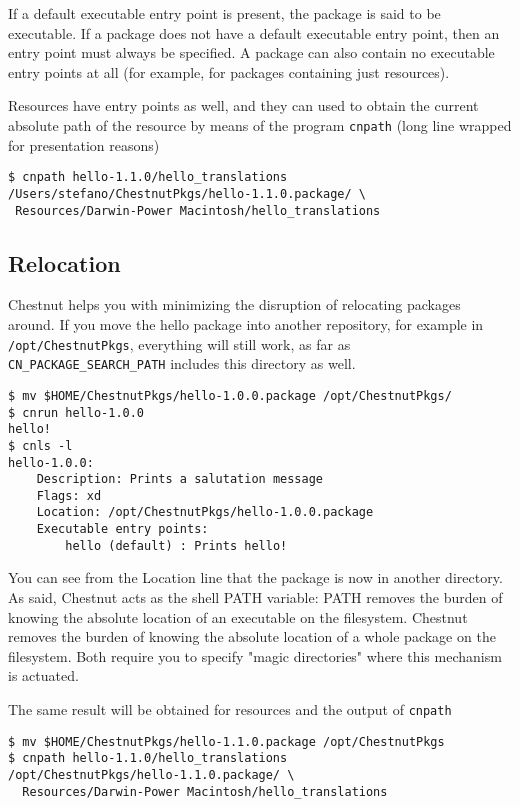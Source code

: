 If a default executable entry point is present, the package is said to be
executable. If a package does not have a default executable entry point, then
an entry point must always be specified. A package can also contain
no executable entry points at all (for example, for packages containing just resources).

Resources have entry points as well, and they can used to obtain the current
absolute path of the resource by means of the program \verb+cnpath+ (long line
wrapped for presentation reasons) 
\begin{verbatim}
$ cnpath hello-1.1.0/hello_translations
/Users/stefano/ChestnutPkgs/hello-1.1.0.package/ \ 
 Resources/Darwin-Power Macintosh/hello_translations
\end{verbatim}

\subsection{Relocation}

Chestnut helps you with minimizing the disruption of relocating packages
around.  If you move the hello package into another repository, for
example in \verb+/opt/ChestnutPkgs+, everything will still work, as far as
\verb+CN_PACKAGE_SEARCH_PATH+ includes this directory as well.

\begin{verbatim}
$ mv $HOME/ChestnutPkgs/hello-1.0.0.package /opt/ChestnutPkgs/
$ cnrun hello-1.0.0
hello!
$ cnls -l
hello-1.0.0:
    Description: Prints a salutation message
    Flags: xd
    Location: /opt/ChestnutPkgs/hello-1.0.0.package
    Executable entry points:
        hello (default) : Prints hello!
\end{verbatim}

You can see from the Location line that the package is now in another
directory.  As said, Chestnut acts as the shell PATH variable: PATH removes the
burden of knowing the absolute location of an executable on the filesystem.
Chestnut removes the burden of knowing the absolute location of a whole package
on the filesystem. Both require you to specify "magic directories" where this
mechanism is actuated.

The same result will be obtained for resources and the output of \verb+cnpath+
\begin{verbatim}
$ mv $HOME/ChestnutPkgs/hello-1.1.0.package /opt/ChestnutPkgs
$ cnpath hello-1.1.0/hello_translations
/opt/ChestnutPkgs/hello-1.1.0.package/ \
  Resources/Darwin-Power Macintosh/hello_translations
\end{verbatim}

